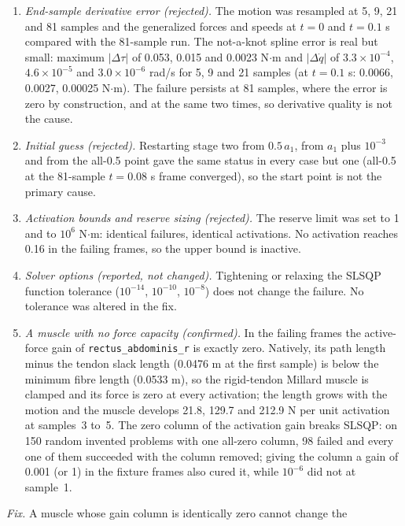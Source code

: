 \begin{enumerate}
  \item \emph{End-sample derivative error (rejected).} The motion was
    resampled at 5, 9, 21 and 81 samples and the generalized forces and speeds
    at $t=0$ and $t=0.1$ s compared with the 81-sample run. The not-a-knot
    spline error is real but small: maximum $|\Delta\tau|$ of 0.053, 0.015 and
    0.0023 N$\cdot$m and $|\Delta\dot q|$ of $3.3\times10^{-4}$,
    $4.6\times10^{-5}$ and $3.0\times10^{-6}$ rad/s for 5, 9 and 21 samples
    (at $t=0.1$ s: 0.0066, 0.0027, 0.00025 N$\cdot$m). The failure persists at
    81 samples, where the error is zero by construction, and at the same two
    times, so derivative quality is not the cause.
  \item \emph{Initial guess (rejected).} Restarting stage two from
    $0.5\,a_1$, from $a_1$ plus $10^{-3}$ and from the all-0.5 point gave the
    same status in every case but one (all-0.5 at the 81-sample $t=0.08$ s
    frame converged), so the start point is not the primary cause.
  \item \emph{Activation bounds and reserve sizing (rejected).} The reserve
    limit was set to 1 and to $10^{6}$ N$\cdot$m: identical failures, identical
    activations. No activation reaches 0.16 in the failing frames, so the
    upper bound is inactive.
  \item \emph{Solver options (reported, not changed).} Tightening or relaxing
    the SLSQP function tolerance ($10^{-14}$, $10^{-10}$, $10^{-8}$) does not
    change the failure. No tolerance was altered in the fix.
  \item \emph{A muscle with no force capacity (confirmed).} In the failing
    frames the active-force gain of \texttt{rectus\_abdominis\_r} is exactly
    zero. Natively, its path length minus the tendon slack length (0.0476 m
    at the first sample) is below the minimum fibre length (0.0533 m), so the
    rigid-tendon Millard muscle is clamped and its force is zero at every
    activation; the length grows with the motion and the muscle develops
    21.8, 129.7 and 212.9 N per unit activation at samples~3 to~5. The zero
    column of the activation gain breaks SLSQP: on 150 random invented
    problems with one all-zero column, 98 failed and every one of them
    succeeded with the column removed; giving the column a gain of 0.001 (or
    1) in the fixture frames also cured it, while $10^{-6}$ did not at
    sample~1.
\end{enumerate}
\emph{Fix.} A muscle whose gain column is identically zero cannot change the
